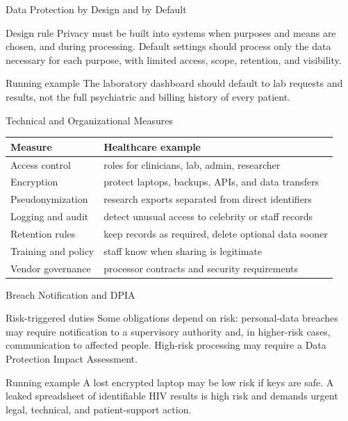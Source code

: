 \documentclass[presentation]{beamer}
\begin{document}
\begin{frame}[c]{Data Protection by Design and by Default}
\begin{block}{Design rule}
Privacy must be built into systems when purposes and means are chosen, and during processing.
Default settings should process only the data necessary for each purpose, with limited access,
scope, retention, and visibility.
\end{block}

\begin{exampleblock}{Running example}
The laboratory dashboard should default to lab requests and results, not the full psychiatric and
billing history of every patient.
\end{exampleblock}
\end{frame}

\begin{frame}[c]{Technical and Organizational Measures}
\small
\begin{tabularx}{\textwidth}{@{}p{}X@{}}
\toprule
\textbf{Measure} & \textbf{Healthcare example} \\
\midrule
Access control & roles for clinicians, lab, admin, researcher \\
Encryption & protect laptops, backups, APIs, and data transfers \\
Pseudonymization & research exports separated from direct identifiers \\
Logging and audit & detect unusual access to celebrity or staff records \\
Retention rules & keep records as required, delete optional data sooner \\
Training and policy & staff know when sharing is legitimate \\
Vendor governance & processor contracts and security requirements \\
\bottomrule
\end{tabularx}
\end{frame}

\begin{frame}[c]{Breach Notification and DPIA}
\begin{block}{Risk-triggered duties}
Some obligations depend on risk: personal-data breaches may require notification to a supervisory
authority and, in higher-risk cases, communication to affected people. High-risk processing may
require a Data Protection Impact Assessment.
\end{block}

\begin{exampleblock}{Running example}
A lost encrypted laptop may be low risk if keys are safe. A leaked spreadsheet of identifiable HIV
results is high risk and demands urgent legal, technical, and patient-support action.
\end{exampleblock}
\end{frame}
\end{document}

